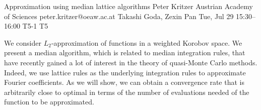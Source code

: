 \documentclass[12pt,lettersize,oneside]{book} %
\begin{document}
\begin{talk}
  {Approximation using median lattice algorithms}%
  {Peter Kritzer}%
  {Austrian Academy of Sciences}%
  {peter.kritzer@oeaw.ac.at}%
  {Takashi Goda, Zexin Pan}%
  {}%
  {Tue, Jul 29 15:30--16:00}%
  {T5-1}%
  {T5}%
  
    
   
We consider $L_2$-approximation of functions in a weighted Korobov space. We present a median algorithm, which is related to median integration rules, that have recently gained a lot of interest in the theory of quasi-Monte Carlo methods. Indeed, we use lattice rules as the underlying integration rules to approximate Fourier coefficients. As we will show, we can obtain a convergence rate that is arbitrarily close to optimal in terms of the number of evaluations needed of the function to be approximated.
\end{talk}
\end{document}
